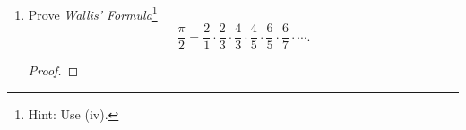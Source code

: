 \documentclass{../homework}
\begin{document}
\begin{Exercise}
\begin{enumerate}
    \begin{solution}
      \begin{proof}

      \end{proof}
    \end{solution}

  \item Prove \emph{Wallis' Formula}\footnote{Hint: Use (iv).}
    \begin{equation*}
      \frac{\pi}{2} = \frac{2}{1} \cdot \frac{2}{3}
      \cdot \frac{4}{3} \cdot \frac{4}{5}
      \cdot \frac{6}{5} \cdot \frac{6}{7} \cdot \cdots.
    \end{equation*}

    \begin{solution}
      \begin{proof}

      \end{proof}
    \end{solution}
  \end{enumerate}
\end{Exercise}
\end{document}
